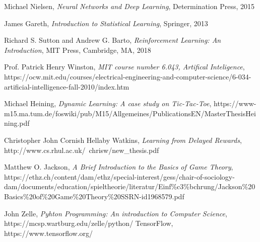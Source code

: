 \documentclass[licencjacka]{pracamgr}
\begin{document}
\begin{thebibliography}{99}


	 Michael Nielsen, \textit{Neural Networks and Deep Learning}, Determination Press, 2015
	
	 James Gareth, \textit{Introduction to Statistical Learning}, Springer, 2013
	
	 Richard S. Sutton and Andrew G. Barto, \textit{Reinforcement Learning: An Introduction},  MIT Press, Cambridge, MA, 2018
	
	 Prof. Patrick Henry Winston, \textit{MIT course number 6.043, Artifical Inteligence}, https://ocw.mit.edu/courses/electrical-engineering-and-computer-science/6-034-artificial-intelligence-fall-2010/index.htm

	 Michael Heining, \textit{Dynamic Learning: A case study on Tic-Tac-Toe}, https://www-m15.ma.tum.de/foswiki/pub/M15/Allgemeines/PublicationsEN/MasterThesisHeining.pdf
	
	 Christopher John Cornish Hellaby Watkins, \textit{Learning from Delayed Rewards}, http://www.cs.rhul.ac.uk/~chrisw/new\_thesis.pdf
	
	  Matthew O. Jackson, \textit{A Brief Introduction to the Basics of Game Theory}, \linebreak https://ethz.ch/content/dam/ethz/special-interest/gess/chair-of-sociology-dam/documents/education/spieltheorie/literatur/Einf\%c3\%bchrung/\linebreak Jackson\%20Basics\%20of\%20Game\%20Theory\%20SSRN-id1968579.pdf

	 John Zelle,  \textit{Pyhton Programming: An introduction to Computer Science}, https://mcsp.wartburg.edu/zelle/python/
	 TensorFlow, https://www.tensorflow.org/
	

\end{thebibliography}
\end{document}
